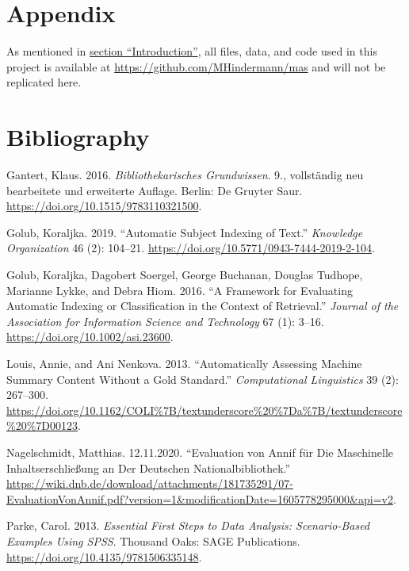 \hypertarget{appendix}{%
\section{Appendix}\label{appendix}}

As mentioned in \protect\hyperlink{introduction}{section
``Introduction''}, all files, data, and code used in this project is
available at \url{https://github.com/MHindermann/mas} and will not be
replicated here.

\hypertarget{bibliography}{%
\section{Bibliography}\label{bibliography}}

\hypertarget{refs}{}
\begin{CSLReferences}{1}{0}
\leavevmode\hypertarget{ref-Gantert.2016}{}%
Gantert, Klaus. 2016. \emph{Bibliothekarisches Grundwissen}. 9.,
vollst{ä}ndig neu bearbeitete und erweiterte Auflage. Berlin: {De
Gruyter Saur}. \url{https://doi.org/10.1515/9783110321500}.

\leavevmode\hypertarget{ref-Golub.2019}{}%
Golub, Koraljka. 2019. {``Automatic Subject Indexing of Text.''}
\emph{Knowledge Organization} 46 (2): 104--21.
\url{https://doi.org/10.5771/0943-7444-2019-2-104}.

\leavevmode\hypertarget{ref-Golub.2016}{}%
Golub, Koraljka, Dagobert Soergel, George Buchanan, Douglas Tudhope,
Marianne Lykke, and Debra Hiom. 2016. {``A Framework for Evaluating
Automatic Indexing or Classification in the Context of Retrieval.''}
\emph{Journal of the Association for Information Science and Technology}
67 (1): 3--16. \url{https://doi.org/10.1002/asi.23600}.

\leavevmode\hypertarget{ref-Louis.2013}{}%
Louis, Annie, and Ani Nenkova. 2013. {``Automatically Assessing Machine
Summary Content Without a Gold Standard.''} \emph{Computational
Linguistics} 39 (2): 267--300.
\url{https://doi.org/10.1162/COLI\%7B/textunderscore\%20\%7Da\%7B/textunderscore\%20\%7D00123}.

\leavevmode\hypertarget{ref-Nagelschmidt.12.11.2020}{}%
Nagelschmidt, Matthias. 12.11.2020. {``Evaluation von Annif f{ü}r Die
Maschinelle Inhaltserschlie{ß}ung an Der Deutschen
Nationalbibliothek.''}
\url{https://wiki.dnb.de/download/attachments/181735291/07-EvaluationVonAnnif.pdf?version=1\&modificationDate=1605778295000\&api=v2}.

\leavevmode\hypertarget{ref-Parke.2013}{}%
Parke, Carol. 2013. \emph{Essential First Steps to Data Analysis:
Scenario-Based Examples Using SPSS}. Thousand Oaks: {SAGE Publications}.
\url{https://doi.org/10.4135/9781506335148}.


\end{CSLReferences}
